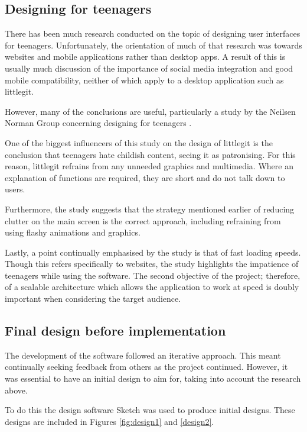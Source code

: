 \subsection {Designing for teenagers}\label{sec:teen-design}

There has been much research conducted on the topic of designing user interfaces for teenagers. Unfortunately, the orientation of much of that research was towards websites and mobile applications rather than desktop apps. A result of this is usually much discussion of the importance of social media integration and good mobile compatibility, neither of which apply to a desktop application such as littlegit.

However, many of the conclusions are useful, particularly a study by the Neilsen Norman Group concerning designing for teenagers \cite{teendesign}. 

One of the biggest influencers of this study on the design of littlegit is the conclusion that teenagers hate childish content, seeing it as patronising. For this reason, littlegit refrains from any unneeded graphics and multimedia. Where an explanation of functions are required, they are short and do not talk down to users.

Furthermore, the study suggests that the strategy mentioned earlier of reducing clutter on the main screen is the correct approach, including refraining from using flashy animations and graphics.

Lastly, a point continually emphasised by the study is that of fast loading speeds. Though this refers specifically to websites, the study highlights the impatience of teenagers while using the software.  The second objective of the project; therefore, of a scalable architecture which allows the application to work at speed is doubly important when considering the target audience.

\subsection{Final design before implementation}

The development of the software followed an iterative approach. This meant continually seeking feedback from others as the project continued. However, it was essential to have an initial design to aim for, taking into account the research above.

To do this the design software Sketch \cite{sketch,} was used to produce initial designs. These designs are included in Figures \ref{fig:design1} and \ref{design2}.





